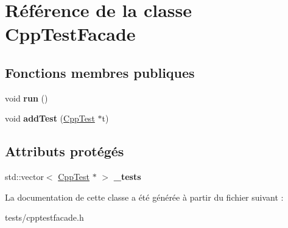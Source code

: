 \hypertarget{class_cpp_test_facade}{\section{Référence de la classe Cpp\+Test\+Facade}
\label{class_cpp_test_facade}
}
\subsection*{Fonctions membres publiques}
\begin{DoxyCompactItemize}
\item 
\hypertarget{class_cpp_test_facade_a8b25432443c019f1375aabc901c77085}{void {\bfseries run} ()}\label{class_cpp_test_facade_a8b25432443c019f1375aabc901c77085}

\item 
\hypertarget{class_cpp_test_facade_a5c320e50a5e1360dcaf458b22bcc0c7e}{void {\bfseries add\+Test} (\hyperlink{class_cpp_test}{Cpp\+Test} $\ast$t)}\label{class_cpp_test_facade_a5c320e50a5e1360dcaf458b22bcc0c7e}

\end{DoxyCompactItemize}
\subsection*{Attributs protégés}
\begin{DoxyCompactItemize}
\item 
\hypertarget{class_cpp_test_facade_ac83a1f9fe9cca5bdf1a6d80226c79a0f}{std\+::vector$<$ \hyperlink{class_cpp_test}{Cpp\+Test} $\ast$ $>$ {\bfseries \+\_\+tests}}\label{class_cpp_test_facade_ac83a1f9fe9cca5bdf1a6d80226c79a0f}

\end{DoxyCompactItemize}


La documentation de cette classe a été générée à partir du fichier suivant \+:\begin{DoxyCompactItemize}
\item 
tests/cpptestfacade.\+h\end{DoxyCompactItemize}
